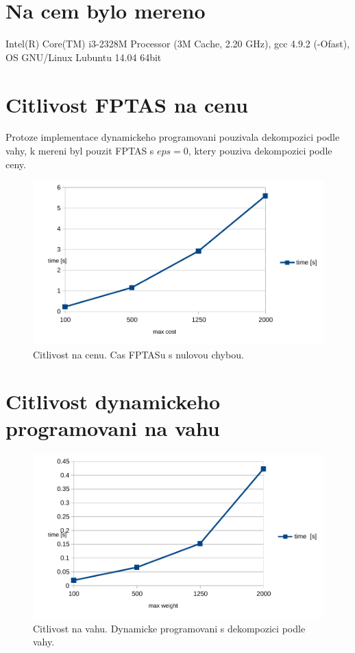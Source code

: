 \documentclass[12pt,a4paper]{article}
\begin{document}
\section{Na cem bylo mereno}
Intel(R) Core(TM) i3-2328M Processor (3M Cache, 2.20 GHz), gcc 4.9.2 (-Ofast), OS GNU/Linux Lubuntu 14.04 64bit




\section{Citlivost FPTAS na cenu}
Protoze implementace dynamickeho programovani pouzivala dekompozici podle vahy, k mereni byl pouzit FPTAS s $eps=0$, ktery pouziva dekompozici podle ceny.
\begin{figure}[H]
	\caption{Citlivost na cenu. Cas FPTASu s nulovou chybou.}
 	\centerline{\includegraphics{./fptas_cost.pdf}}
\end{figure}

\section{Citlivost dynamickeho programovani na vahu}

\begin{figure}[H]
	\caption{Citlivost na vahu. Dynamicke programovani s dekompozici podle vahy.}
 	\centerline{\includegraphics{./h_weight.pdf}}
\end{figure}
\end{document}
